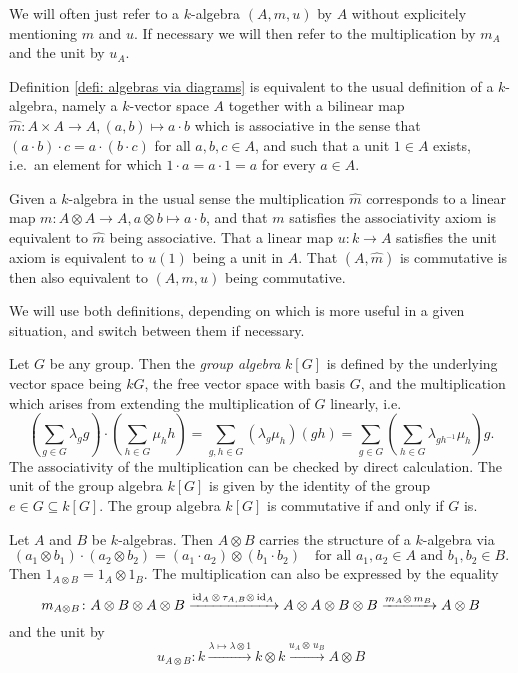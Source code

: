 \begin{rem}
 We will often just refer to a $k$-algebra $(A,m,u)$ by $A$ without explicitely mentioning $m$ and $u$. If necessary we will then refer to the multiplication by $m_A$ and the unit by $u_A$.
\end{rem}


\begin{rem}
 Definition \ref{defi: algebras via diagrams} is equivalent to the usual definition of a $k$-algebra, namely a $k$-vector space $A$ together with a bilinear map $\hat{m} \colon A \times A \to A, (a,b) \mapsto a \cdot b$ which is associative in the sense that $(a \cdot b) \cdot c = a \cdot (b \cdot c)$ for all $a,b,c \in A$, and such that a unit $1 \in A$ exists, i.e.\ an element for which $1 \cdot a = a \cdot 1 = a$ for every $a \in A$.
 
 Given a $k$-algebra in the usual sense the multiplication $\hat{m}$ corresponds to a linear map $m \colon A \otimes A \to A, a \otimes b \mapsto a \cdot b$, and that $m$ satisfies the associativity axiom is equivalent to $\hat{m}$ being associative. That a linear map $u \colon k \to A$ satisfies the unit axiom is equivalent to $u(1)$ being a unit in $A$. That $(A,\hat{m})$ is commutative is then also equivalent to $(A,m,u)$ being commutative.
 
 We will use both definitions, depending on which is more useful in a given situation, and switch between them if necessary.
\end{rem}


\begin{expl}
 Let $G$ be any group. Then the \emph{group algebra} $k[G]$ is defined by the underlying vector space being $kG$, the free vector space with basis $G$, and the multiplication which arises from extending the multiplication of $G$ linearly, i.e.
 \[
  \left( \sum_{g \in G} \lambda_g g \right) \cdot \left( \sum_{h \in G} \mu_h h \right)
  = \sum_{g,h \in G} (\lambda_g \mu_h) (gh)
  = \sum_{g \in G} \left( \sum_{h \in G} \lambda_{gh^{-1}} \mu_h \right) g.
 \]
 The associativity of the multiplication can be checked by direct calculation. The unit of the group algebra $k[G]$ is given by the identity of the group $e \in G \subseteq k[G]$. The group algebra $k[G]$ is commutative if and only if $G$ is.
\end{expl}


\begin{expl}
 Let $A$ and $B$ be $k$-algebras. Then $A \otimes B$ carries the structure of a $k$-algebra via
 \[
  (a_1 \otimes b_1) \cdot (a_2 \otimes b_2)
  = (a_1 \cdot a_2) \otimes (b_1 \cdot b_2)
  \quad\text{for all $a_1, a_2 \in A$ and $b_1, b_2 \in B$}.
 \]
 Then $1_{A \otimes B} = 1_A \otimes 1_B$. The multiplication can also be expressed by the equality
 \[
  m_{A \otimes B} \colon
  A \otimes B \otimes A \otimes B
  \xrightarrow{\operatorname{id}_A \otimes\, \tau_{A,B} \otimes\, \operatorname{id}_A}
  A \otimes A \otimes B \otimes B
  \xrightarrow{m_A \otimes\, m_B}
  A \otimes B
 \]
 and the unit by
 \[
  u_{A \otimes B} \colon
  k
  \xrightarrow{\lambda \mapsto \lambda \otimes 1}
  k \otimes k
  \xrightarrow{u_A \otimes\, u_B}
  A \otimes B
 \]
\end{expl}



